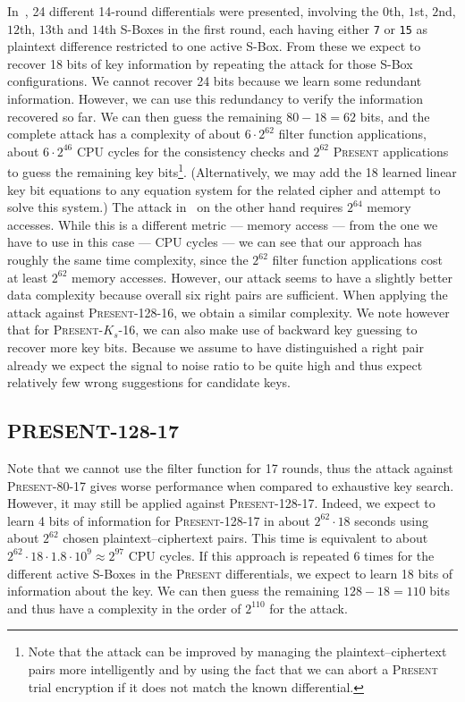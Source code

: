 \documentclass{llncs}
\newcommand{\PRESENT}{\textsc{Present}\xspace}
\begin{document}
In~\cite{present-differentials}, 24 different 14-round
differentials were presented, involving the $0$th, $1$st, $2$nd, $12$th, $13$th
and $14$th S-Boxes in the first round, each having either \texttt{7} or
\texttt{15} as plaintext difference restricted to one active S-Box. From these
we expect to recover 18 bits of key information by repeating the
attack
for those S-Box configurations. We cannot recover 24 bits because
we learn some redundant information. However, we can use this redundancy to
verify the information recovered so far. We can then guess the remaining $80-18
= 62$
bits, and the complete attack has a complexity of about $6 
\cdot 2^{62}$ filter function applications, about $6 \cdot
2^{46}$ CPU cycles
for the consistency checks and $2^{62}$ \PRESENT applications to guess the
remaining key bits\footnote{Note that the attack can be improved by managing the
plaintext--ciphertext pairs more intelligently and by using the fact that we can
abort a \PRESENT trial encryption if it does not match the known
differential.}. (Alternatively, we may add the 18 learned linear key bit
equations to any equation system for the related cipher and attempt to
solve this system.) The attack in~\cite{present-dc:africacrypt} on the other hand requires
$2^{64}$ memory accesses. While this is a different metric --- memory access ---
from the one we have to use in this case --- CPU cycles --- we can see that our
approach has roughly the same time complexity, since the $2^{62}$ filter
function applications cost at least $2^{62}$ memory accesses. However, our
attack seems to have a slightly better data complexity because overall six right
pairs are sufficient. When applying the attack against \PRESENT-128-16, we
obtain a similar complexity. We note however that for \PRESENT-$K_s$-16, we can
also make use of backward key guessing to recover more key bits. Because we
assume to have
distinguished a right pair already we expect the signal to noise ratio to be
quite high and thus expect relatively few wrong suggestions for candidate keys.

\subsection{PRESENT-128-17}

Note that we cannot use the filter function for 17 rounds, thus the attack
against
\PRESENT-80-17 gives worse performance when compared to exhaustive key search.
However, it may still be applied against \PRESENT-128-17. Indeed, we expect to
learn 4 bits of information for \PRESENT-128-17 in about $
2^{62} \cdot 18$ seconds using about $2^{62}$
chosen plaintext--ciphertext pairs. This time is equivalent to about $2^{62}
\cdot 18 \cdot 1.8 \cdot 10^9 \approx 2^{97}$
CPU cycles. If this approach is repeated 6 times for the different active
S-Boxes in the \PRESENT differentials, we expect to learn 18 bits of
information about the key. We can then guess the remaining $128-18=110$ bits and
thus have a complexity in the order of $2^{110}$ for the attack. 
\end{document}
